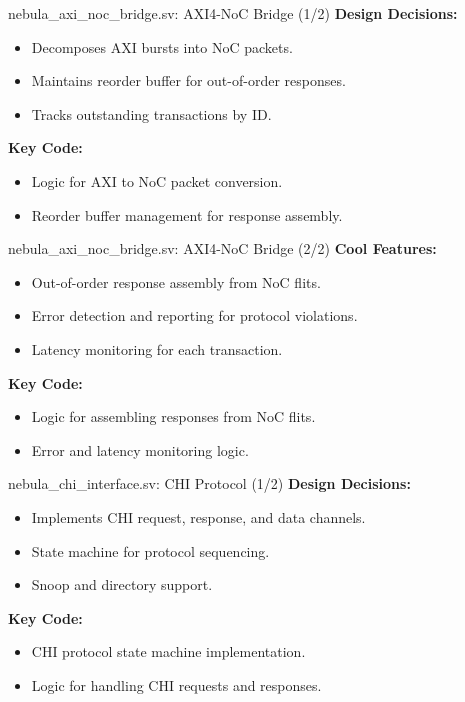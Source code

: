 \documentclass{beamer}
\begin{document}
\begin{frame}{nebula\_axi\_noc\_bridge.sv: AXI4-NoC Bridge (1/2)}
  \textbf{Design Decisions:}
  \begin{itemize}
    \item Decomposes AXI bursts into NoC packets.
    \item Maintains reorder buffer for out-of-order responses.
    \item Tracks outstanding transactions by ID.
  \end{itemize}
  \textbf{Key Code:}
  \begin{itemize}
    \item Logic for AXI to NoC packet conversion.
    \item Reorder buffer management for response assembly.
  \end{itemize}
\end{frame}

\begin{frame}{nebula\_axi\_noc\_bridge.sv: AXI4-NoC Bridge (2/2)}
  \textbf{Cool Features:}
  \begin{itemize}
    \item Out-of-order response assembly from NoC flits.
    \item Error detection and reporting for protocol violations.
    \item Latency monitoring for each transaction.
  \end{itemize}
  \textbf{Key Code:}
  \begin{itemize}
    \item Logic for assembling responses from NoC flits.
    \item Error and latency monitoring logic.
  \end{itemize}
\end{frame}

\begin{frame}{nebula\_chi\_interface.sv: CHI Protocol (1/2)}
  \textbf{Design Decisions:}
  \begin{itemize}
    \item Implements CHI request, response, and data channels.
    \item State machine for protocol sequencing.
    \item Snoop and directory support.
  \end{itemize}
  \textbf{Key Code:}
  \begin{itemize}
    \item CHI protocol state machine implementation.
    \item Logic for handling CHI requests and responses.
  \end{itemize}
\end{frame}
\end{document}

